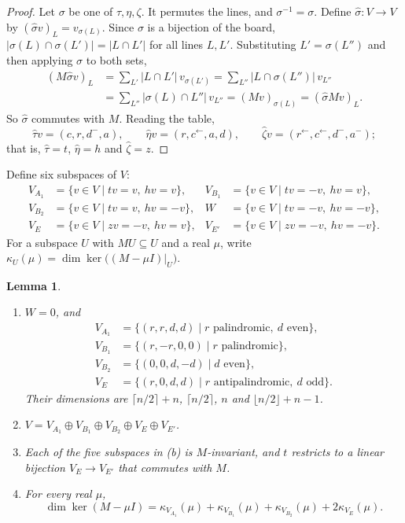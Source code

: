 \documentclass[11pt]{amsart}
\theoremstyle{plain}
\newtheorem{lemma}{Lemma}
\theoremstyle{definition}
\theoremstyle{remark}
\numberwithin{equation}{section}
\newcommand{\abs}[1]{\lvert #1\rvert}
\newcommand{\rev}[1]{#1^{\leftarrow}}  %
\newcommand{\refl}[1]{#1^{-}}          %
\newcommand{\VA}{V_{A_1}}
\newcommand{\VBa}{V_{B_1}}
\newcommand{\VBb}{V_{B_2}}
\newcommand{\VE}{V_{E}}
\newcommand{\VEp}{V_{E'}}
\begin{document}
\begin{proof}
Let \(\sigma\) be one of \(\tau,\eta,\zeta\). It permutes the lines, and
\(\sigma^{-1}=\sigma\). Define \(\hat\sigma\colon V\to V\) by
\((\hat\sigma v)_L=v_{\sigma(L)}\). Since \(\sigma\) is a bijection of the board,
\(\abs{\sigma(L)\cap\sigma(L')}=\abs{L\cap L'}\) for all lines \(L,L'\). Substituting
\(L'=\sigma(L'')\) and then applying \(\sigma\) to both sets,
\begin{align*}
(M\hat\sigma v)_L&=\sum_{L'}\abs{L\cap L'}\,v_{\sigma(L')}
=\sum_{L''}\abs{L\cap\sigma(L'')}\,v_{L''}\\
&=\sum_{L''}\abs{\sigma(L)\cap L''}\,v_{L''}=(Mv)_{\sigma(L)}=(\hat\sigma Mv)_L.
\end{align*}
So \(\hat\sigma\) commutes with \(M\). Reading the table,
\[
\hat\tau v=(c,r,\refl{d},a),\qquad
\hat\eta v=(r,\rev{c},a,d),\qquad
\hat\zeta v=(\rev{r},\rev{c},\refl{d},\refl{a});
\]
that is, \(\hat\tau=t\), \(\hat\eta=h\) and \(\hat\zeta=z\).
\end{proof}

Define six subspaces of \(V\):
\begin{align*}
\VA&=\{v\in V\mid tv=v,\ hv=v\}, & \VBa&=\{v\in V\mid tv=-v,\ hv=v\},\\
\VBb&=\{v\in V\mid tv=v,\ hv=-v\}, & W&=\{v\in V\mid tv=-v,\ hv=-v\},\\
\VE&=\{v\in V\mid zv=-v,\ hv=v\}, & \VEp&=\{v\in V\mid zv=-v,\ hv=-v\}.
\end{align*}
For a subspace \(U\) with \(MU\subseteq U\) and a real \(\mu\), write
\(\kappa_U(\mu)=\dim\ker\bigl((M-\mu I)|_U\bigr)\).

\begin{lemma}\label{lem:sectors}
\begin{enumerate}
\item[(a)] \(W=0\), and
\begin{align}
\VA&=\{(r,r,d,d)\mid r\text{ palindromic},\ d\text{ even}\},\label{eq:VA}\\
\VBa&=\{(r,-r,0,0)\mid r\text{ palindromic}\},\label{eq:VB1}\\
\VBb&=\{(0,0,d,-d)\mid d\text{ even}\},\label{eq:VB2}\\
\VE&=\{(r,0,d,d)\mid r\text{ antipalindromic},\ d\text{ odd}\}.\label{eq:VE}
\end{align}
Their dimensions are \(\lceil n/2\rceil+n\), \(\lceil n/2\rceil\), \(n\) and
\(\lfloor n/2\rfloor+n-1\).
\item[(b)] \(V=\VA\oplus\VBa\oplus\VBb\oplus\VE\oplus\VEp\).
\item[(c)] Each of the five subspaces in (b) is \(M\)-invariant, and \(t\) restricts to
a linear bijection \(\VE\to\VEp\) that commutes with \(M\).
\item[(d)] For every real \(\mu\),
\[
\dim\ker(M-\mu I)=\kappa_{\VA}(\mu)+\kappa_{\VBa}(\mu)+\kappa_{\VBb}(\mu)
+2\kappa_{\VE}(\mu).
\]
\end{enumerate}
\end{lemma}
\end{document}
